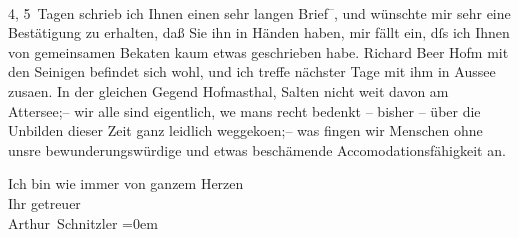                4, 5 Tagen schrieb ich Ihnen einen sehr langen Brief\substVorne{}\textsuperscript{–}\substDazwischen{},\substHinten{} und wünschte mir sehr eine Bestätigung zu erhalten, daß Sie ihn in Händen
               haben, mir fällt ein, dſs ich Ihnen von gemeinsamen Beka{\geminationn}ten kaum etwas geschrieben habe. Richard Beer
                  Hofm mit den Seinigen befindet sich wohl, und ich treffe nächster Tage mit
               ihm in Aussee zusa{\geminationm}en. In der gleichen Gegend Hofma{\geminationn}sthal, Salten nicht weit davon am Attersee;–
               wir alle sind eigentlich, we{\geminationn} mans recht bedenkt –
               bisher – über die Unbilden dieser Zeit ganz leidlich weggeko{\geminationm}en;– was fingen wir Menschen ohne {\pb}unsre bewunderungswürdige und etwas beschämende
               Accomodationsfähigkeit an.\pend
           
\pstart
           Ich bin wie immer von ganzem Herzen{\\[\baselineskip]}Ihr getreuer{\\[\baselineskip]}\spacefill\mbox{Arthur Schnitzler}\pend
           \leftskip=0em{}\endnumbering{}  \newcommand{\dateiname}{L02355}\newcommand{\titel}{Arthur Schnitzler an Georg Brandes, 21. 8. 1920}\newcommand{\editorInnen}{Martin Anton Müller und Gerd-Hermann Susen}
